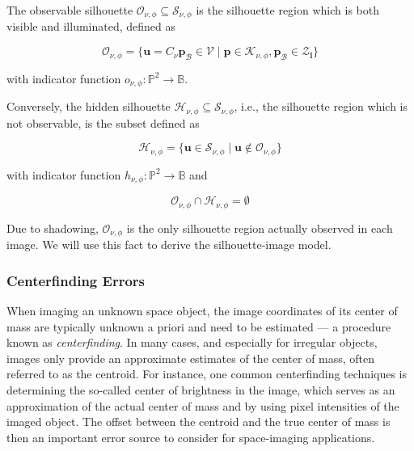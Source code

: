 \begin{definition}
    \label{def:O_nu}
    The observable silhouette $\mathcal{O}_{\nu,\phi}\subseteq \mathcal{S}_{\nu,\phi}$ is the silhouette region which is both visible and illuminated, defined as

    \begin{equation}
        \mathcal{O}_{\nu,\phi} = \{ \mathbf{u}=C_\nu \mathbf{p}_\mathcal{B}\in\mathcal{V} \; | \; \mathbf{p}\in \mathcal{K}_{\nu,\phi}, \mathbf{p}_\mathcal{B}\in \mathcal{Z}_\mathbf{l} \}
    \end{equation}

        with indicator function $o_{\nu,\phi}: \mathbb{P}^2 \rightarrow \mathbb{B}$.

        Conversely, the hidden silhouette $\mathcal{H}_{\nu,\phi} \subseteq \mathcal{S}_{\nu,\phi}$, i.e., the silhouette region which is not observable, is the subset defined as

    \begin{equation}
        \mathcal{H}_{\nu,\phi} = \{ \mathbf{u}\in \mathcal{S}_{\nu,\phi} \; | \; \mathbf{u} \notin \mathcal{O}_{\nu,\phi} \}
    \end{equation}

    with indicator function $h_{\nu,\phi}:\mathbb{P}^2 \rightarrow \mathbb{B}$ and

    \begin{equation}
        \mathcal{O}_{\nu,\phi} \cap \mathcal{H}_{\nu,\phi} = \emptyset
    \end{equation}
\end{definition}

Due to shadowing, $\mathcal{O}_{\nu,\phi}$ is the only silhouette region actually observed in each image. We will use this fact to derive the silhouette-image model.

\subsubsection{Centerfinding Errors}

When imaging an unknown space object, the image coordinates of its center of mass are typically unknown a priori and need to be estimated --- a procedure known as \textit{centerfinding}. In many cases, and especially for irregular objects, images only provide an approximate estimates of the center of mass, often referred to as the centroid. For instance, one common centerfinding techniques is determining the so-called center of brightness in the image, which serves as an approximation of the actual center of mass and by using pixel intensities of the imaged object\cite{owen2011methods}. The offset between the centroid and the true center of mass is then an important error source to consider for space-imaging applications.

